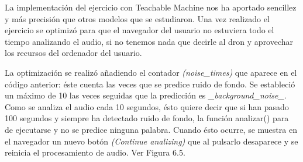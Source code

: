 La implementación del ejercicio con Teachable Machine  nos ha aportado sencillez y más precisión que otros modelos que se estudiaron.
Una vez realizado el ejercicio se optimizó para que el navegador del usuario no estuviera todo el tiempo analizando el  audio, si no tenemos nada que decirle al dron y aprovechar los recursos del ordenador del usuario.

La optimización se realizó añadiendo el contador \textit{(noise\_times)} que aparece en el código anterior: éste cuenta las veces que se predice ruido de fondo. Se estableció un máximo de 10 las veces seguidas que la predicción es \textit{\_background\_noise\_}. Como se analiza el audio cada 10 segundos, ésto quiere decir que si han pasado 100 segundos y siempre ha detectado ruido de fondo, la función analizar() para de ejecutarse y no se predice ninguna palabra. Cuando ésto ocurre, se muestra en el navegador un nuevo botón \textit{(Continue analizing)} que al pulsarlo desaparece y se reinicia el procesamiento de audio. Ver Figura 6.5.

